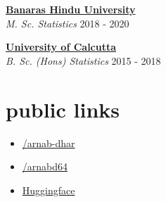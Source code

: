 \documentclass[12pt]{article}
\newcommand{\entry}[4]{{{\textbf{#1}}} \hfill #3 \\ #2 \hfill #4}
\begin{document}
\begin{paracol}{2}
\begin{flushleft}
\entry{\href{https://www.bhu.ac.in/Site/Home/1_2_16_Main-Site}{Banaras Hindu University}}{\emph{M. Sc. Statistics}}{}{2018 - 2020}
\medskip

\entry{\href{https://caluniv.ac.in/}{University of Calcutta}}{\emph{B. Sc. (Hons) Statistics}}{}{2015 - 2018}

\end{flushleft}

\section{public links}

\begin{itemize}[itemsep=1pt]
  \item[\faLinkedin] \href{https://www.linkedin.com/in/arnab-dhar}{/arnab-dhar}
  \item[\faGithub] \href{https://www.github.com/arnabd64}{/arnabd64} 
  \item[\faLink] \href{https://hf.co/arnabdhar}{Huggingface} 
\end{itemize}


\end{paracol}
\end{document}

